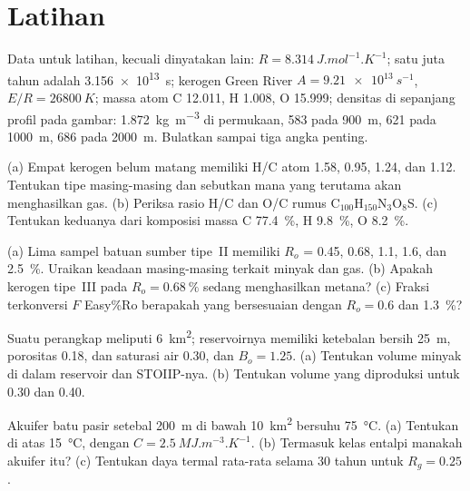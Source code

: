 \section*{Latihan}\label{sec:b2:energy-geology:exercises}

Data untuk latihan, kecuali dinyatakan lain: $R = \qty{8.314}{J.mol^{-1}.K^{-1}}$; satu juta
tahun adalah \qty{3.156e13}{s}; kerogen Green River $A = \qty{9.21e13}{s^{-1}}$, $E/R = \qty{26800}{K}$;
massa atom C 12.011, H 1.008, O 15.999; densitas  di sepanjang profil pada gambar:
\qty{1.872}{kg.m^{-3}} di permukaan, 583 pada \qty{900}{m}, 621 pada \qty{1000}{m}, 686 pada
\qty{2000}{m}. Bulatkan sampai tiga angka penting.

\begin{exercise}[$\star$]\label{exo:b2:energy-geology:1}
(a) Empat kerogen belum matang memiliki H/C atom 1.58, 0.95, 1.24, dan 1.12. Tentukan tipe masing-masing dan sebutkan
mana yang terutama akan menghasilkan gas. (b) Periksa rasio H/C dan O/C rumus
C$_{100}$H$_{150}$N$_3$O$_8$S. (c) Tentukan keduanya dari komposisi massa C \qty{77.4}{\percent}, H
\qty{9.8}{\percent}, O \qty{8.2}{\percent}.
\end{exercise}

\begin{exercise}[$\star$]\label{exo:b2:energy-geology:2}
(a) Lima sampel batuan sumber tipe~II memiliki $R_o$ = 0.45, 0.68, 1.1, 1.6, dan \qty{2.5}{\percent}.
Uraikan keadaan masing-masing terkait minyak dan gas. (b) Apakah kerogen tipe~III pada $R_o =
\qty{0.68}{\percent}$ sedang menghasilkan metana? (c) Fraksi terkonversi $F$ Easy\%Ro berapakah yang bersesuaian dengan
$R_o = 0.6$ dan \qty{1.3}{\percent}?
\end{exercise}

\begin{exercise}[$\star$]\label{exo:b2:energy-geology:3}
Suatu perangkap meliputi \qty{6}{km^2}; reservoirnya memiliki ketebalan bersih \qty{25}{m}, porositas 0.18, dan saturasi
air 0.30, dan $B_o = 1.25$. (a) Tentukan volume minyak di dalam reservoir dan STOIIP-nya. (b) Tentukan
volume yang diproduksi untuk  0.30 dan 0.40.
\end{exercise}

\begin{exercise}[$\star$]\label{exo:b2:energy-geology:4}
Akuifer batu pasir setebal \qty{200}{m} di bawah \qty{10}{km^2} bersuhu \qty{75}{\celsius}. (a) Tentukan
 di atas \qty{15}{\celsius}, dengan $C = \qty{2.5}{MJ.m^{-3}.K^{-1}}$. (b) Termasuk kelas
entalpi manakah akuifer itu? (c) Tentukan daya termal rata-rata selama 30 tahun untuk $R_g = 0.25$.
\end{exercise}

